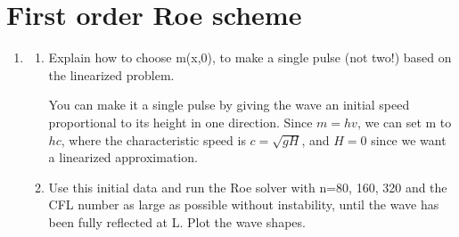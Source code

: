 

\section{First order Roe scheme} 

\label{sec:first_order_roe_scheme} 
\begin{enumerate}
	\item 
	\begin{enumerate}
		\item Explain how to choose m(x,0), to make a single pulse (not two!) based on the linearized problem. 
		
		You can make it a single pulse by giving the wave an initial speed proportional to its height in one direction. Since $m=hv$, we can set m to $hc$, where the characteristic speed is $c=\sqrt{gH}$, and $H=0$ since we want a linearized approximation.
		
		\item Use this initial data and run the Roe solver with n=80, 160, 320 and the CFL number as large as possible without instability, until the wave has been fully reflected at L. Plot the wave shapes. 
		

\end{enumerate}
\end{enumerate}

